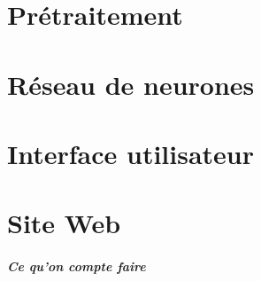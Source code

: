 \documentclass[]{report}
\begin{document}


	\chapter{Pr\'etraitement} %
	\label{cha:pr'etraitement}
	
		

	
	\chapter{R\'eseau de neurones} %
	\label{cha:r'eseau_de_neurones}
	
		


	\chapter{Interface utilisateur} %
	\label{cha:interface_utilisateur}
	
		
	
	\chapter{Site Web} %
	\label{cha:site_web}
	



\paragraph{Ce qu'on compte faire} %
\label{par:ce_qu_on_compte_faire}





















 
 
\end{document}
